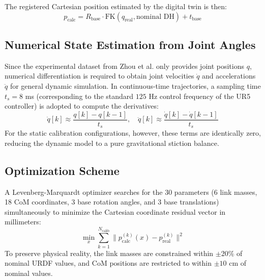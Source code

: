 \documentclass[journal]{IEEEtran}
\begin{document}
The registered Cartesian position estimated by the digital twin is then:
\begin{equation}
    p_{\text{calc}} = R_{\text{base}} \cdot \text{FK}(q_{\text{real}}, \text{nominal DH}) + t_{\text{base}}
\end{equation}

\subsection{Numerical State Estimation from Joint Angles}
Since the experimental dataset from Zhou et al. \cite{zhou2026gtpn} only provides joint positions $q$, numerical differentiation is required to obtain joint velocities $\dot{q}$ and accelerations $\ddot{q}$ for general dynamic simulation. In continuous-time trajectories, a sampling time $t_s = 8$ ms (corresponding to the standard $125$ Hz control frequency of the UR5 controller) is adopted to compute the derivatives:
\begin{equation}
    \dot{q}[k] \approx \frac{q[k] - q[k-1]}{t_s}, \quad \ddot{q}[k] \approx \frac{\dot{q}[k] - \dot{q}[k-1]}{t_s}
\end{equation}
For the static calibration configurations, however, these terms are identically zero, reducing the dynamic model to a pure gravitational stiction balance.

\subsection{Optimization Scheme}
A Levenberg-Marquardt optimizer searches for the 30 parameters (6 link masses, 18 CoM coordinates, 3 base rotation angles, and 3 base translations) simultaneously to minimize the Cartesian coordinate residual vector in millimeters:
\begin{equation}
    \min_{x} \sum_{k=1}^{N_{\text{calib}}} \| p_{\text{calc}}^{(k)}(x) - p_{\text{real}}^{(k)} \|^2
\end{equation}
To preserve physical reality, the link masses are constrained within $\pm 20\%$ of nominal URDF values, and CoM positions are restricted to within $\pm 10$ cm of nominal values.
\end{document}
